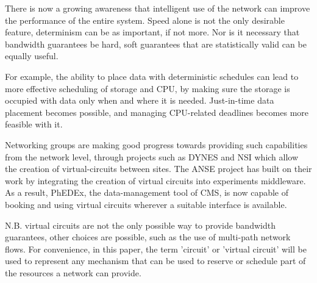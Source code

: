There is now a growing awareness that intelligent use of the network can improve the performance of the entire system. Speed alone is not the only desirable feature, determinism can be as important, if not more. Nor is it necessary that bandwidth guarantees be hard, soft guarantees that are statistically valid can be equally useful.

For example, the ability to place data with deterministic schedules can lead to more effective scheduling of storage and CPU, by making sure the storage is occupied with data only when and where it is needed. Just-in-time data placement becomes possible, and managing CPU-related deadlines becomes more feasible with it.

Networking groups are making good progress towards providing such capabilities from the network level, through projects such as DYNES\cite{DYNES} and NSI\cite{NSI} which allow the creation of virtual-circuits between sites. The ANSE\cite{ANSE} project has built on their work by integrating the creation of virtual circuits into experiments middleware. As a result, PhEDEx\cite{PhEDEx}, the data-management tool of CMS, is now capable of booking and using virtual circuits wherever a suitable interface is available.

N.B. virtual circuits are not the only possible way to provide bandwidth guarantees, other choices are possible, such as the use of multi-path network flows. For convenience, in this paper, the term 'circuit' or 'virtual circuit' will be used to represent any mechanism that can be used to reserve or schedule part of the resources a network can provide.